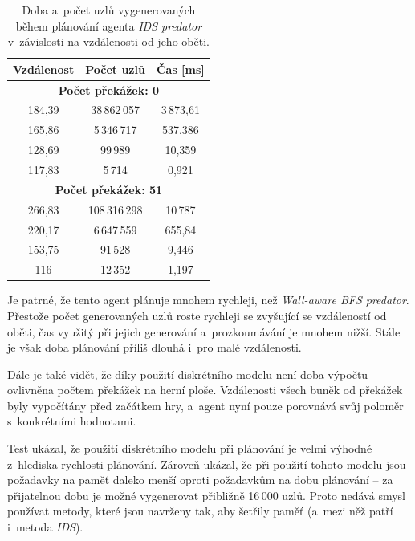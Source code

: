 \begin{table}[ht]
    \centering
    \begin{tabular}{|c|c|c|} \hline
        \textbf{Vzdálenost} & \textbf{Počet uzlů} & \textbf{Čas [ms]} \\ \hline\hline
        \multicolumn{3}{|c|}{\textbf{Počet překážek: 0}}              \\ \hline
        184,39              & 38\,862\,057        & 3\,873,61         \\ \hline
        165,86              & 5\,346\,717         & 537,386           \\ \hline
        128,69              & 99\,989             & 10,359            \\ \hline
        117,83              & 5\,714              & 0,921             \\ \hline\hline
        \multicolumn{3}{|c|}{\textbf{Počet překážek: 51}}             \\ \hline
        266,83              & 108\,316\,298       & 10\,787           \\ \hline
        220,17              & 6\,647\,559         & 655,84            \\ \hline
        153,75              & 91\,528             & 9,446             \\ \hline
        116                 & 12\,352             & 1,197             \\ \hline
    \end{tabular}
    \caption{Doba a~počet uzlů vygenerovaných během plánování agenta \emph{IDS predator} v~závislosti na vzdálenosti od jeho oběti.}
    \label{tab:benchmark-ids-predator}
\end{table}

Je patrné, že tento agent plánuje mnohem rychleji, než \emph{Wall-aware BFS predator}. Přestože počet generovaných uzlů roste rychleji se zvyšující se vzdáleností od oběti, čas využitý při jejich generování a~prozkoumávání je mnohem nižší. Stále je však doba plánování příliš dlouhá i~pro malé vzdálenosti.

Dále je také vidět, že díky použití diskrétního modelu není doba výpočtu ovlivněna počtem překážek na herní ploše. Vzdálenosti všech buněk od překážek byly vypočítány před začátkem hry, a~agent nyní pouze porovnává svůj poloměr s~konkrétními hodnotami.

Test ukázal, že použití diskrétního modelu při plánování je velmi výhodné z~hlediska rychlosti plánování. Zároveň ukázal, že při použití tohoto modelu jsou požadavky na paměť daleko menší oproti požadavkům na dobu plánování -- za přijatelnou dobu je možné vygenerovat přibližně 16\,000 uzlů. Proto nedává smysl používat metody, které jsou navrženy tak, aby šetřily paměť (a~mezi něž patří i~metoda \emph{IDS}).


